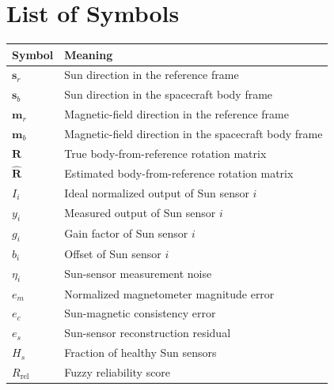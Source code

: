 \documentclass[11pt,a4paper]{article}
\begin{document}
\tableofcontents
\clearpage
\section*{List of Symbols}

\begin{table}[H]
\centering
\renewcommand{\arraystretch}{1.15}
\begin{tabularx}{\textwidth}{|p{2.7cm}|X|}
\hline
\textbf{Symbol} & \textbf{Meaning} \\
\hline
$\mathbf{s}_r$ & Sun direction in the reference frame \\
\hline
$\mathbf{s}_b$ & Sun direction in the spacecraft body frame \\
\hline
$\mathbf{m}_r$ & Magnetic-field direction in the reference frame \\
\hline
$\mathbf{m}_b$ & Magnetic-field direction in the spacecraft body frame \\
\hline
$\mathbf{R}$ & True body-from-reference rotation matrix \\
\hline
$\hat{\mathbf{R}}$ & Estimated body-from-reference rotation matrix \\
\hline
$I_i$ & Ideal normalized output of Sun sensor $i$ \\
\hline
$y_i$ & Measured output of Sun sensor $i$ \\
\hline
$g_i$ & Gain factor of Sun sensor $i$ \\
\hline
$b_i$ & Offset of Sun sensor $i$ \\
\hline
$\eta_i$ & Sun-sensor measurement noise \\
\hline
$e_m$ & Normalized magnetometer magnitude error \\
\hline
$e_c$ & Sun-magnetic consistency error \\
\hline
$e_s$ & Sun-sensor reconstruction residual \\
\hline
$H_s$ & Fraction of healthy Sun sensors \\
\hline
$R_{\mathrm{rel}}$ & Fuzzy reliability score \\
\hline
\end{tabularx}
\end{table}

\clearpage


\end{document}
